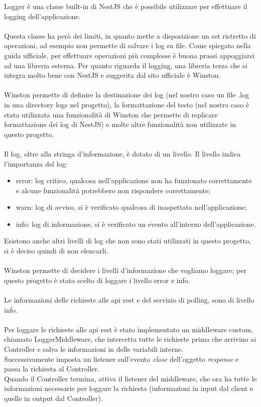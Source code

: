 \leavevmode\newline
Logger è una classe built-in di NestJS che è possibile utilizzare per effettuare il logging 
dell'applicazione. 
\\\\
Questa classe ha però dei limiti, in quanto mette a disposizione un set ristretto di operazioni, ad esempio 
non permette di salvare i log su file. Come spiegato nella 
guida ufficiale, per effettuare operazioni più complesse è buona prassi appoggiarsi ad una libreria
esterna. Per quanto riguarda il logging, una libreria terza che si integra molto bene con NestJS e suggerita dal sito ufficiale è
Winston.
\\\\
Winston permette di definire la destinazione dei log (nel nostro caso un file .log in una directory logs nel
progetto), la formattazione del testo (nel nostro caso è stata utilizzata una funzionalità di Winston che permette
di replicare formattazione dei log di NestJS) e molte altre funzionalità non utilizzate
in questo progetto.
\\\\
Il log, oltre alla stringa d'informazione, è dotato di un livello.
Il livello 
indica l'importanza del log:
\begin{itemize}
    \item error: log critico, qualcosa nell'applicazione non ha funzionato correttamente e
        alcune funzionalità potrebbero non rispondere correttamente;
    \item warn: log di avviso, si è verificato qualcosa di inaspettato nell'applicazione;
    \item info: log di informazione, si è verificato un evento all'interno dell'applicazione.
\end{itemize}
\leavevmode\newline
Esistono anche altri livelli di log che non sono stati utilizzati in questo progetto, si è deciso quindi di non elencarli.
\\\\
Winston permette di decidere i livelli d'informazione che vogliamo loggare; per questo progetto è stato scelto di loggare
i livello error e info.
\\\\
Le informazioni delle richieste alle \gls{api} \gls{rest} e del servizio di polling, sono di livello info.
\\\\
Per loggare le richieste alle \gls{api} \gls{rest} è stato implementato un middleware custom, chiamato LoggerMiddleware, che intercetta tutte le 
richieste prima che arrivino ai Controller e salva le informazioni in delle variabili interne.
\\
Successivamente imposta un listener sull'evento \textit{close} dell'oggetto \textit{response} e passa la richiesta al Controller.
\\
Quando il Controller termina, attiva il listener del middleware, che ora ha tutte le informazioni necessarie per loggare la richiesta 
(informazioni in input dal client e quelle in output dal Controller).

